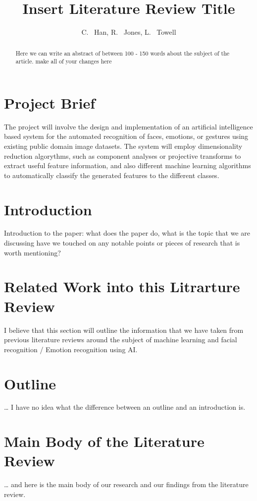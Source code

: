 \documentclass[a4paper, twoside, 11pt]{article}
\author{C. ~Han, R. ~Jones, L. ~Towell}
\title{Insert Literature Review Title}
\begin{document}
	\maketitle
	
	\begin{abstract}
		Here we can write an abstract of between 100 - 150 words about the subject of the article. make all of your changes here 
	\end{abstract}
	\tableofcontents
	
	\section{Project Brief}
	The project will involve the design and implementation of an artificial intelligence based system for the automated recognition of faces, emotions, or gestures using existing public domain image datasets. The system will employ dimensionality reduction algorythms, such as component analyses or projective transforms to extract useful feature information, and also different machine learning algorithms to automatically classify the generated features to the different classes.
	\section{Introduction}
	Introduction to the paper: what does the paper do, what is the topic that we are discussing have we touched on any notable points or pieces of research that is worth mentioning?
	\section{Related Work into this Litrarture Review}
	I believe that this section will outline the information that we have taken from previous literature reviews around the subject of machine learning and facial recognition / Emotion recognition using AI.
	\section{Outline}
	\ldots{} I have no idea what the difference between an outline and an introduction is.
	\section{Main Body of the Literature Review}
	\ldots{} and here is the main body of our research and our findings from the literature review. \
	
\end{document}
